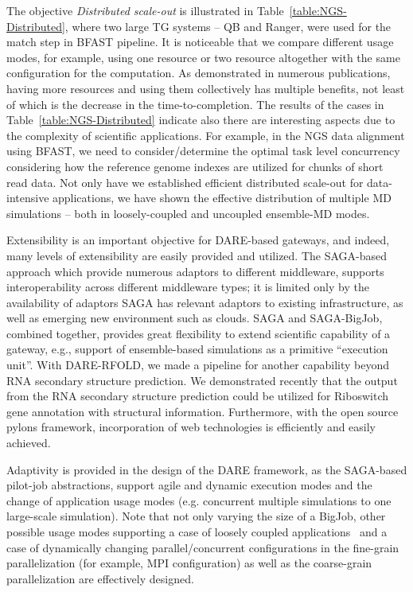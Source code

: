 \documentclass{sig-alternate}
\begin{document}
The objective {\it Distributed scale-out} is illustrated in
Table~\ref{table:NGS-Distributed}, where two large TG systems --
QB and Ranger, were used for the match step in BFAST pipeline.  It is
noticeable that we compare different usage modes, for example, using
one resource or two resource altogether with the same configuration
for the computation.  As demonstrated in numerous publications, having
more resources and using them collectively has multiple benefits, not
least of which is the decrease in the time-to-completion.  The results
of the cases in Table~\ref{table:NGS-Distributed} indicate also there
are interesting aspects due to the complexity of scientific
applications.  For example, in the NGS data alignment using BFAST, we
need to consider/determine the optimal task level concurrency
considering how the reference genome indexes are utilized for chunks
of short read data\cite{ecmls11}. Not only have we established
efficient distributed scale-out for data-intensive applications, we
have shown the effective distribution of multiple MD simulations --
both in loosely-coupled and uncoupled ensemble-MD modes.

Extensibility is an important objective for DARE-based gateways, and
indeed, many levels of extensibility are easily provided and utilized.
The SAGA-based approach which provide numerous adaptors to different
middleware, supports interoperability across different middleware
types; it is limited only by the availability of adaptors SAGA has
relevant adaptors to existing infrastructure, as well as emerging new
environment such as clouds. SAGA and SAGA-BigJob, combined together,
provides great flexibility to extend scientific capability of a
gateway, e.g., support of ensemble-based simulations as a primitive
``execution unit''. With DARE-RFOLD, we made a pipeline for another
capability beyond RNA secondary structure prediction.  We demonstrated
recently that the output from the RNA secondary structure prediction
could be utilized for Riboswitch gene annotation with structural
information.  Furthermore, with the open source pylons framework,
incorporation of web technologies is efficiently and easily achieved.

Adaptivity is provided in the design of the DARE framework, as the
SAGA-based pilot-job abstractions, support agile and dynamic execution
modes and the change of application usage modes (e.g. concurrent
multiple simulations to one large-scale simulation). 
Note that not only varying the size of
a BigJob, other possible usage modes supporting a case of loosely
coupled applications~\cite{coupled} and a case of dynamically changing
parallel/concurrent configurations in the fine-grain parallelization
(for example, MPI configuration) as well as the coarse-grain
parallelization are effectively designed.
\end{document}
